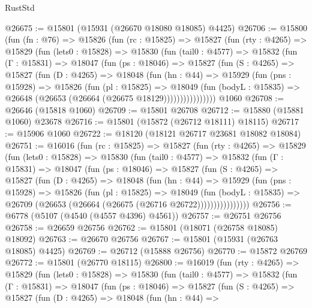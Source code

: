 \begin{lexlean}{RustStd}
\begin{coremodule}
@26675 := @15801 (@15931 (@26670 @18080 @18085) @4425)
@26706 := @15800
    (fun (fn : @76) =>
    @15826
      (fun (rc : @15825) =>
      @15827
        (fun (rty : @4265) =>
        @15829
          (fun (lets0 : @15828) =>
          @15830
            (fun (tail0 : @4577) =>
            @15832
              (fun (Γ : @15831) =>
              @18047
                (fun (ps : @18046) =>
                @15827
                  (fun (S : @4265) =>
                  @15827
                    (fun (D : @4265) =>
                    @18048
                      (fun (hn : @44) =>
                      @15929
                        (fun (pns : @15928) =>
                        @15826
                          (fun (pl : @15825) =>
                          @18049
                            (fun (bodyL : @15835) =>
                            @26648 (@26653 (@26664 (@26675 @18129))))))))))))))))
    @1060
@26708 := @26646 (@15818 @1060)
@26709 := @15801 @26708
@26712 := @15880 (@15881 @1060) @23678
@26716 := @15801 (@15872 (@26712 @18111) @18115)
@26717 := @15906 @1060
@26722 := @18120 (@18121 @26717 @23681 @18082 @18084)
@26751 := @16016
    (fun (rc : @15825) =>
    @15827
      (fun (rty : @4265) =>
      @15829
        (fun (lets0 : @15828) =>
        @15830
          (fun (tail0 : @4577) =>
          @15832
            (fun (Γ : @15831) =>
            @18047
              (fun (ps : @18046) =>
              @15827
                (fun (S : @4265) =>
                @15827
                  (fun (D : @4265) =>
                  @18048
                    (fun (hn : @44) =>
                    @15929
                      (fun (pns : @15928) =>
                      @15826
                        (fun (pl : @15825) =>
                        @18049
                          (fun (bodyL : @15835) =>
                          @26709 (@26653 (@26664 (@26675 (@26716 @26722))))))))))))))))
@26756 := @6778 (@5107 (@4540 (@4557 @4396) @4561))
@26757 := @26751 @26756
@26758 := @26659 @26756
@26762 := @15801 (@18071 (@26758 @18085) @18092)
@26763 := @26670 @26756
@26767 := @15801 (@15931 (@26763 @18085) @4425)
@26769 := @26712 (@15888 @26756)
@26770 := @15872 @26769
@26772 := @15801 (@26770 @18115)
@26800 := @16019
    (fun (rty : @4265) =>
    @15829
      (fun (lets0 : @15828) =>
      @15830
        (fun (tail0 : @4577) =>
        @15832
          (fun (Γ : @15831) =>
          @18047
            (fun (ps : @18046) =>
            @15827
              (fun (S : @4265) =>
              @15827
                (fun (D : @4265) =>
                @18048
                  (fun (hn : @44) =>

\end{coremodule}
\end{lexlean}
